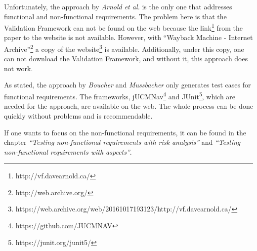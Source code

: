 Unfortunately, the approach by \textit{Arnold et al.} is the only one that addresses functional and non-functional requirements. The problem here is that the Validation Framework can not be found on the web because the link\footnote{http://vf.davearnold.ca/} from the paper to the website is not available. However, with \enquote{Wayback Machine - Internet Archive}\footnote{http://web.archive.org/} a copy of the website\footnote{https://web.archive.org/web/20161017193123/http://vf.davearnold.ca/} is available. Additionally, under this copy, one can not download the Validation Framework, and without it, this approach does not work.  

As stated, the approach by \textit{Boucher} and \textit{Mussbacher} only generates test cases for functional requirements. The frameworks, jUCMNav\footnote{https://github.com/JUCMNAV} and JUnit\footnote{https://junit.org/junit5/}, which are needed for the approach, are available on the web. The whole process can be done quickly without problems and is recommendable.

If one wants to focus on the non-functional requirements, it can be found in the chapter \textit{\enquote{Testing non-functional requirements with risk analysis}} and \textit{\enquote{Testing non-functional requirements with aspects}}.

